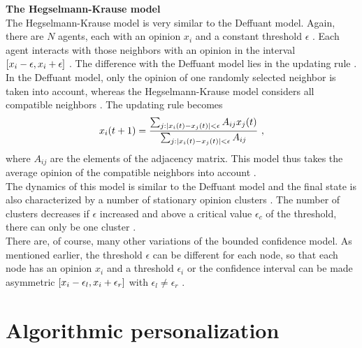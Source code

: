 \documentclass[11 pt , letterpaper , twoside , openright]{book}
\begin{document}
\newline
\textbf{The Hegselmann-Krause model}\\
\newline
The Hegselmann-Krause model is very similar to the Deffuant model. Again, there are $N$ agents, each with an opinion $x_i$ and a constant threshold $\epsilon$ \cite{Castellano2009}. Each agent interacts with those neighbors with an opinion in the interval $\interval{x_i-\epsilon}{x_i+\epsilon}$ \cite{Castellano2009}. The difference with the Deffuant model lies in the updating rule \cite{Castellano2009}. In the Deffuant model, only the opinion of one randomly selected neighbor is taken into account, whereas the Hegselmann-Krause model considers all compatible neighbors \cite{Castellano2009}. The updating rule becomes \cite{Castellano2009}
\begin{equation}
	x_i(t+1) = \frac{\sum_{j:\abs{x_i(t) - x_j(t)}<\epsilon}A_{ij}x_j(t)}{\sum_{j:\abs{x_i(t) - x_j(t)}<\epsilon}A_{ij}} \ ,
\end{equation}
where $A_{ij}$ are the elements of the adjacency matrix. This model thus takes the average opinion of the compatible neighbors into account \cite{Castellano2009}.\\
The dynamics of this model is similar to the Deffuant model and the final state is also characterized by a number of stationary opinion clusters \cite{Castellano2009}. The number of clusters decreases if $\epsilon$ increased and above a critical value $\epsilon_c$ of the threshold, there can only be one cluster \cite{Castellano2009}.\\
\newline
There are, of course, many other variations of the bounded confidence model. As mentioned earlier, the threshold $\epsilon$ can be different for each node, so that each node has an opinion $x_i$ and a threshold $\epsilon_i$ or the confidence interval can be made asymmetric $\interval{x_i - \epsilon_l}{x_i + \epsilon_r}$ with $\epsilon_l \neq
\epsilon_r$ \cite{Krause2002}.




\section{Algorithmic personalization}\label{filter}
\end{document}
